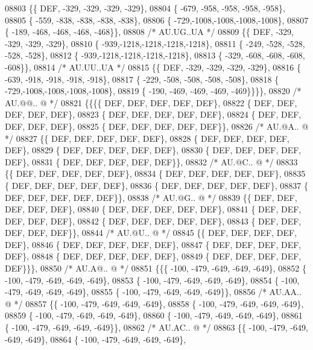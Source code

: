 \begin{DoxyCode}
08803 \{\{  DEF, -329, -329, -329, -329\},
08804 \{ -679, -958, -958, -958, -958\},
08805 \{ -559, -838, -838, -838, -838\},
08806 \{ -729,-1008,-1008,-1008,-1008\},
08807 \{ -189, -468, -468, -468, -468\}\},
08808 \textcolor{comment}{/* AU.UG..UA */}
08809 \{\{  DEF, -329, -329, -329, -329\},
08810 \{ -939,-1218,-1218,-1218,-1218\},
08811 \{ -249, -528, -528, -528, -528\},
08812 \{ -939,-1218,-1218,-1218,-1218\},
08813 \{ -329, -608, -608, -608, -608\}\},
08814 \textcolor{comment}{/* AU.UU..UA */}
08815 \{\{  DEF, -329, -329, -329, -329\},
08816 \{ -639, -918, -918, -918, -918\},
08817 \{ -229, -508, -508, -508, -508\},
08818 \{ -729,-1008,-1008,-1008,-1008\},
08819 \{ -190, -469, -469, -469, -469\}\}\}\},
08820 \textcolor{comment}{/* AU.@@.. @ */}
08821 \{\{\{\{  DEF,  DEF,  DEF,  DEF,  DEF\},
08822 \{  DEF,  DEF,  DEF,  DEF,  DEF\},
08823 \{  DEF,  DEF,  DEF,  DEF,  DEF\},
08824 \{  DEF,  DEF,  DEF,  DEF,  DEF\},
08825 \{  DEF,  DEF,  DEF,  DEF,  DEF\}\},
08826 \textcolor{comment}{/* AU.@A.. @ */}
08827 \{\{  DEF,  DEF,  DEF,  DEF,  DEF\},
08828 \{  DEF,  DEF,  DEF,  DEF,  DEF\},
08829 \{  DEF,  DEF,  DEF,  DEF,  DEF\},
08830 \{  DEF,  DEF,  DEF,  DEF,  DEF\},
08831 \{  DEF,  DEF,  DEF,  DEF,  DEF\}\},
08832 \textcolor{comment}{/* AU.@C.. @ */}
08833 \{\{  DEF,  DEF,  DEF,  DEF,  DEF\},
08834 \{  DEF,  DEF,  DEF,  DEF,  DEF\},
08835 \{  DEF,  DEF,  DEF,  DEF,  DEF\},
08836 \{  DEF,  DEF,  DEF,  DEF,  DEF\},
08837 \{  DEF,  DEF,  DEF,  DEF,  DEF\}\},
08838 \textcolor{comment}{/* AU.@G.. @ */}
08839 \{\{  DEF,  DEF,  DEF,  DEF,  DEF\},
08840 \{  DEF,  DEF,  DEF,  DEF,  DEF\},
08841 \{  DEF,  DEF,  DEF,  DEF,  DEF\},
08842 \{  DEF,  DEF,  DEF,  DEF,  DEF\},
08843 \{  DEF,  DEF,  DEF,  DEF,  DEF\}\},
08844 \textcolor{comment}{/* AU.@U.. @ */}
08845 \{\{  DEF,  DEF,  DEF,  DEF,  DEF\},
08846 \{  DEF,  DEF,  DEF,  DEF,  DEF\},
08847 \{  DEF,  DEF,  DEF,  DEF,  DEF\},
08848 \{  DEF,  DEF,  DEF,  DEF,  DEF\},
08849 \{  DEF,  DEF,  DEF,  DEF,  DEF\}\}\},
08850 \textcolor{comment}{/* AU.A@.. @ */}
08851 \{\{\{ -100, -479, -649, -649, -649\},
08852 \{ -100, -479, -649, -649, -649\},
08853 \{ -100, -479, -649, -649, -649\},
08854 \{ -100, -479, -649, -649, -649\},
08855 \{ -100, -479, -649, -649, -649\}\},
08856 \textcolor{comment}{/* AU.AA.. @ */}
08857 \{\{ -100, -479, -649, -649, -649\},
08858 \{ -100, -479, -649, -649, -649\},
08859 \{ -100, -479, -649, -649, -649\},
08860 \{ -100, -479, -649, -649, -649\},
08861 \{ -100, -479, -649, -649, -649\}\},
08862 \textcolor{comment}{/* AU.AC.. @ */}
08863 \{\{ -100, -479, -649, -649, -649\},
08864 \{ -100, -479, -649, -649, -649\},

\end{DoxyCode}
